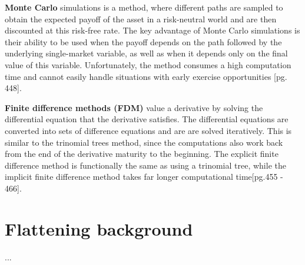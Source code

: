 \textbf{Monte Carlo} simulations is a method, where different paths are sampled to obtain the expected payoff of the asset in a risk-neutral world and are then discounted at this risk-free rate. The key advantage of Monte Carlo simulations is their ability to be used when the payoff depends on the path followed by the underlying single-market variable, as well as when it depends only on the final value of this variable. Unfortunately, the method consumes a high computation time and cannot easily handle situations with early exercise opportunities \cite{ofod}[pg. 448].   

\textbf{Finite difference methods (FDM)} value a derivative by solving the differential equation that the derivative satisfies. The differential equations are converted into sets of difference equations and are are solved iteratively. This is similar to the trinomial trees method, since the computations also work back from the end of the derivative maturity to the beginning. The explicit finite difference method is functionally the same as using a trinomial tree, while the implicit finite difference method takes far longer computational time\cite{ofod}[pg.455 - 466].

\section{Flattening background}
...